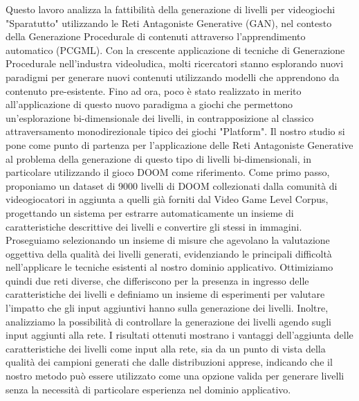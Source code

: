 Questo lavoro analizza la fattibilit\`a della generazione di livelli per videogiochi "Sparatutto" utilizzando le Reti Antagoniste Generative (GAN), nel contesto della Generazione Procedurale di contenuti attraverso l'apprendimento automatico (PCGML).
Con la crescente applicazione di tecniche di Generazione Procedurale nell'industra videoludica, molti ricercatori stanno esplorando nuovi paradigmi per generare nuovi contenuti utilizzando modelli che apprendono da contenuto pre-esistente. Fino ad ora, poco \`e stato realizzato in merito all'applicazione di questo nuovo paradigma a giochi che permettono un'esplorazione bi-dimensionale dei livelli, in contrapposizione al classico attraversamento monodirezionale tipico dei giochi "Platform". Il nostro studio si pone come punto di partenza per l'applicazione delle Reti Antagoniste Generative al problema della generazione di questo tipo di livelli bi-dimensionali, in particolare utilizzando il gioco DOOM come riferimento.
Come primo passo, proponiamo un dataset di 9000 livelli di DOOM collezionati dalla comunit\`a di videogiocatori in aggiunta a quelli gi\`a forniti dal Video Game Level Corpus, progettando un sistema per estrarre automaticamente un insieme di caratteristiche descrittive dei livelli e convertire gli stessi in immagini. Proseguiamo selezionando un insieme di misure che agevolano la valutazione oggettiva della qualit\`a dei livelli generati, evidenziando le principali difficolt\`a nell'applicare le tecniche esistenti al nostro dominio applicativo. Ottimiziamo quindi due reti diverse, che differiscono per la presenza in ingresso delle caratteristiche dei livelli e definiamo un insieme di esperimenti per valutare l'impatto che gli input aggiuntivi hanno sulla generazione dei livelli. Inoltre, analizziamo la possibilit\`a di controllare la generazione dei livelli agendo sugli input aggiunti alla rete. I risultati ottenuti mostrano i vantaggi dell'aggiunta delle caratteristiche dei livelli come input alla rete, sia da un punto di vista della qualit\`a dei campioni generati che dalle distribuzioni apprese, indicando che il nostro metodo pu\`o essere utilizzato come una opzione valida per generare livelli senza la necessit\`a di particolare esperienza nel dominio applicativo.
 





